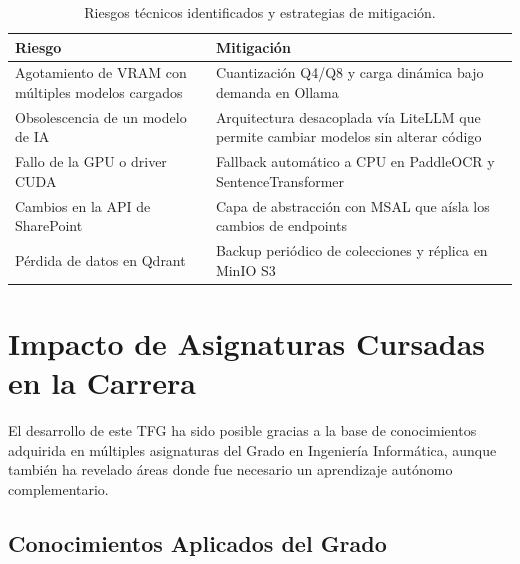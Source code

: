 \begin{table}[H]
\centering
\caption{Riesgos técnicos identificados y estrategias de mitigación.}
\label{tab:riesgos}
\begin{tabular}{p{5cm}p{7cm}}
\toprule
\textbf{Riesgo} & \textbf{Mitigación} \\
\midrule
Agotamiento de VRAM con múltiples modelos cargados & Cuantización Q4/Q8 y carga dinámica bajo demanda en Ollama \\
Obsolescencia de un modelo de IA & Arquitectura desacoplada vía LiteLLM que permite cambiar modelos sin alterar código \\
Fallo de la GPU o driver CUDA & Fallback automático a CPU en PaddleOCR y SentenceTransformer \\
Cambios en la API de SharePoint & Capa de abstracción con MSAL que aísla los cambios de endpoints \\
Pérdida de datos en Qdrant & Backup periódico de colecciones y réplica en MinIO S3 \\
\bottomrule
\end{tabular}
\end{table}

\section{Impacto de Asignaturas Cursadas en la Carrera}

El desarrollo de este TFG ha sido posible gracias a la base de conocimientos adquirida en múltiples asignaturas del Grado en Ingeniería Informática, aunque también ha revelado áreas donde fue necesario un aprendizaje autónomo complementario.

\subsection{Conocimientos Aplicados del Grado}

